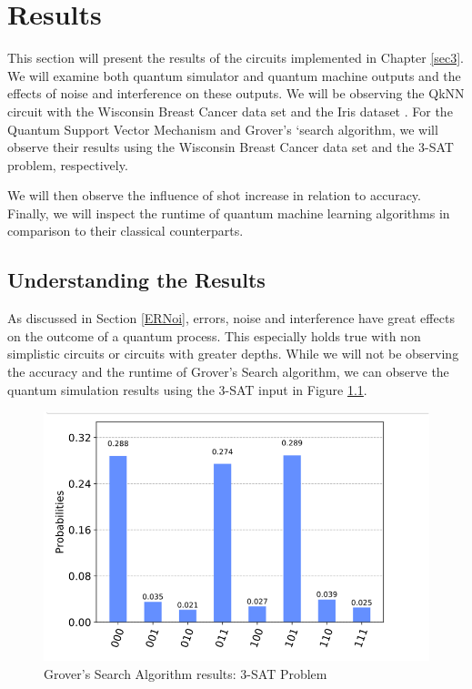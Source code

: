 \chapter{Results}\label{result}

This section will present the results of the circuits implemented in Chapter \ref{sec3}. We will examine both quantum simulator and quantum machine outputs and the effects of noise and interference on these outputs. We will be observing the QkNN circuit with the Wisconsin Breast Cancer data set \citep{BCWisconsinData} and the Iris dataset \citep{irisData}. For the Quantum Support Vector Mechanism and Grover's `search algorithm, we will observe their results using the Wisconsin Breast Cancer data set and the 3-SAT \citep{3SATData} problem, respectively.

We will then observe the influence of shot increase in relation to accuracy. Finally, we will inspect the runtime of quantum machine learning algorithms in comparison to their classical counterparts. 


\section{Understanding the Results}

As discussed in Section \ref{ERNoi}, errors, noise and interference have great effects on the outcome of a quantum process. This especially holds true with non simplistic circuits or circuits with greater depths. While we will not be observing the accuracy and the runtime of Grover's Search algorithm, we can observe the quantum simulation results using the 3-SAT input in Figure \ref{GrovRun}.  

\begin{figure}[H]
      \centering
      \includegraphics[scale=0.7]{background/Grovers.png}
      \caption{Grover's Search Algorithm results: 3-SAT Problem}
      \label{GrovRun}
\end{figure}


